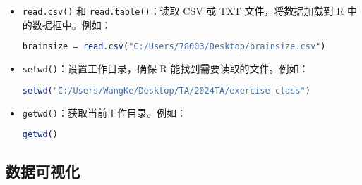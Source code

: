 \documentclass[UTF8]{report}
\theoremstyle{MyLineTheoremStyle} %
\theoremstyle{MyBlockTheoremStyle} %
\theoremstyle{MySubsubsectionStyle} %
\begin{document}
\begin{itemize}
    \item \texttt{read.csv()} 和 \texttt{read.table()}：读取 CSV 或 TXT 文件，将数据加载到 R 中的数据框中。例如：
    \begin{lstlisting}[language=R]
    brainsize = read.csv("C:/Users/78003/Desktop/brainsize.csv")
    \end{lstlisting}
    \item \texttt{setwd()}：设置工作目录，确保 R 能找到需要读取的文件。例如：
    \begin{lstlisting}[language=R]
    setwd("C:/Users/WangKe/Desktop/TA/2024TA/exercise class")
    \end{lstlisting}
    \item \texttt{getwd()}：获取当前工作目录。例如：
    \begin{lstlisting}[language=R]
    getwd()
    \end{lstlisting}
\end{itemize}

\subsection*{数据可视化}
\end{document}
